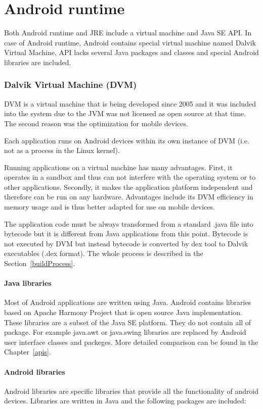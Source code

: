 \section{Android runtime}
Both Android runtime and JRE include a virtual machine and Java SE API. In case of Android runtime, Android contains special virtual machine named Dalvik Virtual Machine, API lacks several Java packages and classes and special Android libraries are included.

\subsubsection{Dalvik Virtual Machine (DVM)}
DVM is a virtual machine that is being developed since 2005 and it was included into the system due to the JVM was not licensed as open source at that time. The second reason was the optimization for mobile devices. 

Each application runs on Android devices within its own instance of DVM (i.e. not as a process in the Linux kernel).

Running applications on a virtual machine has many advantages. First, it operates in a sandbox and thus can not interfere with the operating system or to other applications. Secondly, it makes the application platform independent and therefore can be run on any hardware. Advantages include its DVM efficiency in memory usage and is thus better adapted for use on mobile devices.

The application code must be always transformed from a standard .java file into bytecode but it is different from Java applications from this point. Bytecode is not executed by DVM but instead bytecode is converted by dex tool to Dalvik executables (.dex format). The whole process is described in the Section~\ref{buildProcess}.


\paragraph{Java libraries}
Most of Android applications are written using Java. Android contains libraries based on Apache Harmony Project that is open source Java implementation. These libraries are a subset of the Java SE platform. They do not contain all of package. For example java.awt or java.swing libraries are replaced by Android user interface classes and packeges. More detailed comparison can be found in the Chapter~\ref{apis}.

\paragraph{Android libraries}
Android libraries are specific libraries that provide all the functionality of android devices. Libraries are written in Java and the following packages are included:

